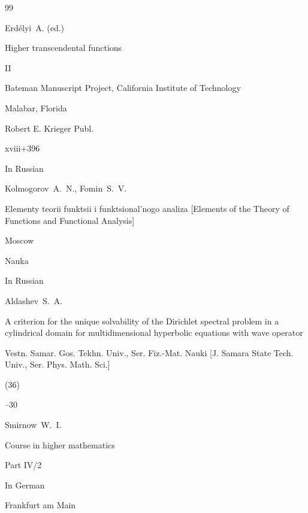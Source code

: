 \begin{thebibliography}{99}

\by Erdélyi~A. (ed.)

\book  Higher transcendental functions

\bookvol II


\serial Bateman Manuscript Project, California Institute of Technology

\publaddr Malabar, Florida

\publ Robert E. Krieger Publ. 

\totalpages xviii+396 





\lang In Russian

\by  Kolmogorov~A.~N., Fomin~S.~V.

\book  Elementy teorii funktsii i funktsional'nogo analiza \rm [Elements of the Theory of Functions and Functional Analysis]

\publaddr Moscow

\publ Nauka






\lang In Russian

\by Aldashev~S.~A.

\paper A criterion for the unique solvability of the Dirichlet spectral problem in a cylindrical domain for multidimensional hyperbolic equations with wave operator

\jour Vestn. Samar. Gos. Tekhn. Univ., Ser. Fiz.-Mat. Nauki \rm [J. Samara State Tech. Univ., Ser. Phys. Math. Sci.]


(36)

--30





\by Smirnow~W.~I.

\book Course in higher mathematics

\bookinfo Part IV/2

\lang In German


\publaddr Frankfurt am Main


\end{thebibliography}

